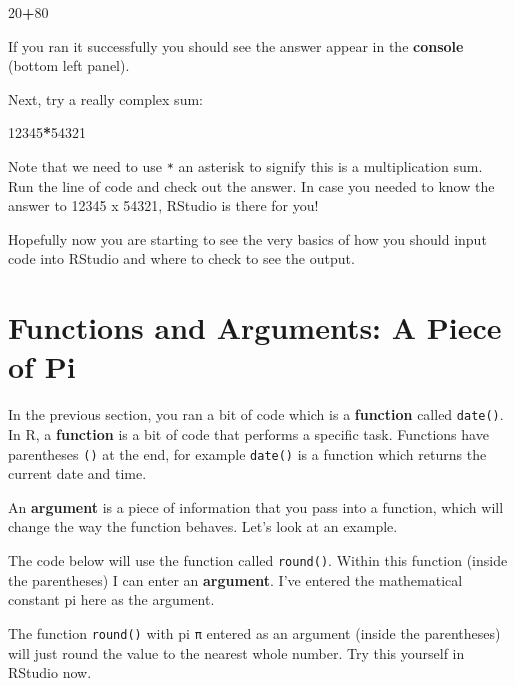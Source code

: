 \documentclass[
]{book}
\newenvironment{Shaded}{\begin{snugshade}}{\end{snugshade}}
\newcommand{\DecValTok}[1]{\textcolor[rgb]{0.00,0.00,0.81}{#1}}
\newcommand{\SpecialCharTok}[1]{\textcolor[rgb]{0.81,0.36,0.00}{\textbf{#1}}}
\let\oldsection\section
\renewcommand{\section}{\needspace{5\baselineskip}\oldsection}
\begin{document}
\begin{Shaded}
\begin{Highlighting}[]
\DecValTok{20}\SpecialCharTok{+}\DecValTok{80}
\end{Highlighting}
\end{Shaded}

If you ran it successfully you should see the answer appear in the \textbf{console} (bottom left panel).

Next, try a really complex sum:

\begin{Shaded}
\begin{Highlighting}[]
\DecValTok{12345}\SpecialCharTok{*}\DecValTok{54321}
\end{Highlighting}
\end{Shaded}

Note that we need to use \texttt{*} an asterisk to signify this is a multiplication sum. Run the line of code and check out the answer. In case you needed to know the answer to 12345 x 54321, RStudio is there for you!

Hopefully now you are starting to see the very basics of how you should input code into RStudio and where to check to see the output.

\section{Functions and Arguments: A Piece of Pi}\label{functions-and-arguments-a-piece-of-pi}

In the previous section, you ran a bit of code which is a \textbf{function} called \texttt{date()}. In R, a \textbf{function} is a bit of code that performs a specific task. Functions have parentheses \texttt{()} at the end, for example \texttt{date()} is a function which returns the current date and time.

An \textbf{argument} is a piece of information that you pass into a function, which will change the way the function behaves. Let's look at an example.

The code below will use the function called \texttt{round()}. Within this function (inside the parentheses) I can enter an \textbf{argument}. I've entered the mathematical constant pi here as the argument.

The function \texttt{round()} with pi \texttt{π} entered as an argument (inside the parentheses) will just round the value to the nearest whole number. Try this yourself in RStudio now.
\end{document}

